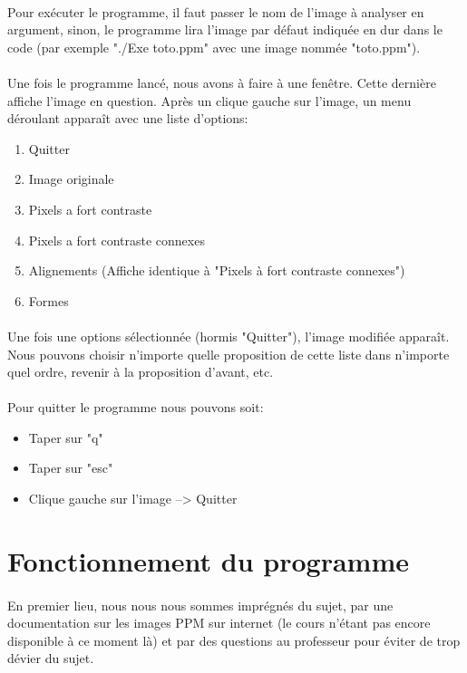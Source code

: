 \documentclass[a4paper , 10pt]{article}
\begin{document}
\paragraph{}Pour exécuter le programme, il faut passer le nom de l'image à analyser en argument, sinon, le programme lira l'image par défaut indiquée en dur dans le code (par exemple "./Exe toto.ppm" avec une image nommée "toto.ppm").\paragraph{}
Une fois le programme lancé, nous avons à faire à une fenêtre. Cette dernière affiche l'image en question. Après un clique gauche sur l'image, un menu déroulant apparaît avec une liste d'options:
\begin{enumerate}
\item Quitter
\item Image originale
\item Pixels a fort contraste
\item Pixels a fort contraste connexes
\item Alignements (Affiche identique à "Pixels à fort contraste connexes")
\item Formes
\end{enumerate}
\paragraph{}
Une fois une options sélectionnée (hormis "Quitter"), l'image modifiée apparaît. Nous pouvons choisir n'importe quelle proposition de cette liste dans n'importe quel ordre, revenir à la proposition d'avant, etc.
\paragraph{}
Pour quitter le programme nous pouvons soit:
\begin{itemize}
\item Taper sur "q"
\item Taper sur "esc"  	
\item Clique gauche sur l'image --> Quitter
\end{itemize}
\section{Fonctionnement du programme}
\paragraph{}
En premier lieu, nous nous nous sommes imprégnés du sujet, par une documentation sur les images PPM sur internet (le cours n'étant pas encore disponible à ce moment là) et par des questions au professeur pour éviter de trop dévier du sujet. 
\end{document}
